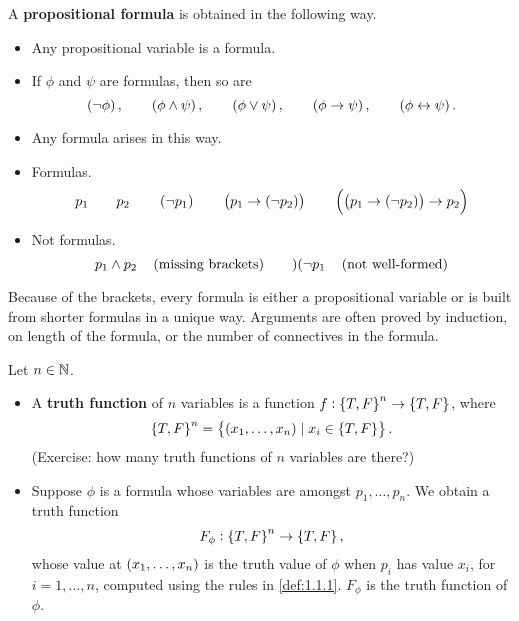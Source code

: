 \begin{definition}
\label{def:1.1.2}
A \textbf{propositional formula} is obtained in the following way.
\begin{itemize}
\item Any propositional variable is a formula.
\item If $ \phi $ and $ \psi $ are formulas, then so are
$$ \notb{\phi}, \qquad \andb{\phi}{\psi}, \qquad \orb{\phi}{\psi}, \qquad \impb{\phi}{\psi}, \qquad \iffb{\phi}{\psi}. $$
\item Any formula arises in this way.
\end{itemize}
\end{definition}

\pagebreak

\begin{example*}
\hfill
\begin{itemize}
\item Formulas.
$$ p_1 \qquad p_2 \qquad \notb{p_1} \qquad \impb{p_1}{\notb{p_2}} \qquad \impb{\impb{p_1}{\notb{p_2}}}{p_2} $$
\item Not formulas.
$$ p_1 \land p_2 \quad \br{\text{missing brackets}} \qquad )( \neg p_1 \quad \br{\text{not well-formed}} $$
\end{itemize}
\end{example*}

Because of the brackets, every formula is either a propositional variable or is built from shorter formulas in a unique way. Arguments are often proved by induction, on length of the formula, or the number of connectives in the formula.

\begin{definition}
Let $ n \in \mathbb{N} $.
\begin{itemize}
\item A \textbf{truth function} of $ n $ variables is a function $ f : \cbr{T, F}^n \to \cbr{T, F} $, where
$$ \cbr{T, F}^n = \cbr{\br{x_1, \dots, x_n} \mid x_i \in \cbr{T, F}}. $$
(Exercise: how many truth functions of $ n $ variables are there?)
\item Suppose $ \phi $ is a formula whose variables are amongst $ p_1, \dots, p_n $. We obtain a truth function
$$ F_\phi : \cbr{T, F}^n \to \cbr{T, F}, $$
whose value at $ \br{x_1, \dots, x_n} $ is the truth value of $ \phi $ when $ p_i $ has value $ x_i $, for $ i = 1, \dots, n $, computed using the rules in \ref{def:1.1.1}. $ F_\phi $ is the truth function of $ \phi $.
\end{itemize}
\end{definition}

